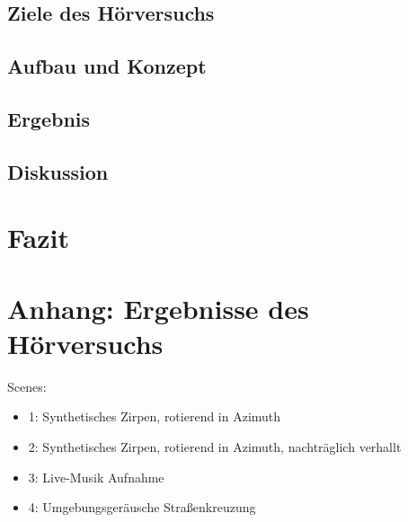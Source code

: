 \documentclass[12pt, a4paper]{article}
\begin{document}
    \subsection{Ziele des Hörversuchs}
    
    \subsection{Aufbau und Konzept}
    \label{aufbau_und_konzept}
    
    \subsection{Ergebnis}
    
    \subsection{Diskussion}
    
\newpage
\section{Fazit}

\newpage



\newpage
\appendix

\newpage

\section{Anhang: Ergebnisse des Hörversuchs}


Scenes:
\begin{itemize}
    \item 1: Synthetisches Zirpen, rotierend in Azimuth
    \item 2: Synthetisches Zirpen, rotierend in Azimuth, nachträglich verhallt
    \item 3: Live-Musik Aufnahme
    \item 4: Umgebungsgeräusche Straßenkreuzung
\end{itemize}
\end{document}
